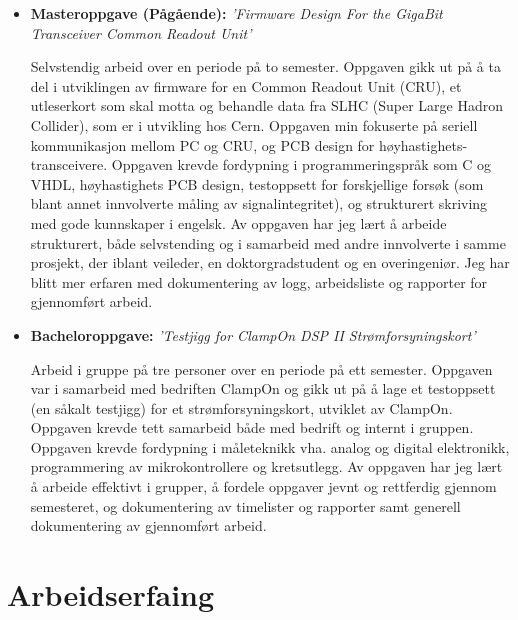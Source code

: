 \documentclass[11pt,a4paper,sans,norsk]{moderncv}        %
\begin{document}
\begin{itemize}

\item{\textbf{Masteroppgave (Pågående):} \textit{'Firmware Design For the GigaBit Transceiver Common Readout Unit'}

\vspace{3pt}

\small{Selvstendig arbeid over en periode på to semester. Oppgaven gikk ut på å ta del i utviklingen av firmware for en Common Readout Unit (CRU), et utleserkort som skal motta og behandle data fra SLHC (Super Large Hadron Collider), som er i utvikling hos Cern. Oppgaven min fokuserte på seriell kommunikasjon mellom PC og CRU, og PCB design for høyhastighets-transceivere. Oppgaven krevde fordypning i programmeringspråk som C og VHDL, høyhastighets PCB design, testoppsett for forskjellige forsøk (som blant annet innvolverte måling av signalintegritet), og strukturert skriving med gode kunnskaper i engelsk. Av oppgaven har jeg lært å arbeide strukturert, både selvstending og i samarbeid med andre innvolverte i samme prosjekt, der iblant veileder, en doktorgradstudent og en overingeniør. Jeg har blitt mer erfaren med dokumentering av logg, arbeidsliste og rapporter for gjennomført arbeid.}}

\vspace{6pt}
\newpage

\item{\textbf{Bacheloroppgave:} \textit{'Testjigg for ClampOn DSP II Strømforsyningskort'}

\vspace{3pt}

\small{Arbeid i gruppe på tre personer over en periode på ett semester. Oppgaven var i samarbeid med bedriften ClampOn og gikk ut på å lage et testoppsett (en såkalt testjigg) for et strømforsyningskort, utviklet av ClampOn. Oppgaven krevde tett samarbeid både med bedrift og internt i gruppen. Oppgaven krevde fordypning i måleteknikk vha. analog og digital elektronikk, programmering av mikrokontrollere og kretsutlegg. Av oppgaven har jeg lært å arbeide effektivt i grupper, å fordele oppgaver jevnt og rettferdig gjennom semesteret, og dokumentering av timelister og rapporter samt generell dokumentering av gjennomført arbeid.}}

\end{itemize}


\section{Arbeidserfaing}
\end{document}
